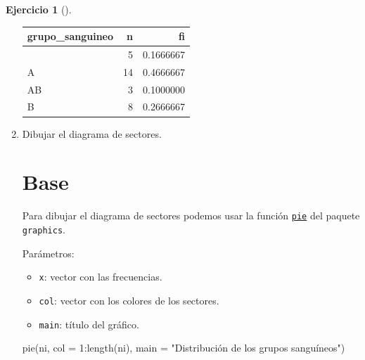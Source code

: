\documentclass[
  spanish,
  a4paper,
]{scrreport}
\newenvironment{Shaded}{\begin{snugshade}}{\end{snugshade}}
\newcommand{\AttributeTok}[1]{\textcolor[rgb]{0.40,0.45,0.13}{#1}}
\newcommand{\DecValTok}[1]{\textcolor[rgb]{0.68,0.00,0.00}{#1}}
\newcommand{\FunctionTok}[1]{\textcolor[rgb]{0.28,0.35,0.67}{#1}}
\newcommand{\NormalTok}[1]{\textcolor[rgb]{0.00,0.23,0.31}{#1}}
\newcommand{\SpecialCharTok}[1]{\textcolor[rgb]{0.37,0.37,0.37}{#1}}
\newcommand{\StringTok}[1]{\textcolor[rgb]{0.13,0.47,0.30}{#1}}
\providecommand{\tightlist}{%
  \setlength{\itemsep}{0pt}\setlength{\parskip}{0pt}}
\theoremstyle{definition}
\newtheorem{exercise}{Ejercicio}[chapter]
\theoremstyle{remark}
\begin{document}
\begin{exercise}[]
\begin{enumerate}
\begin{tcolorbox}
  \begin{longtable}[]{@{}lrr@{}}
  \toprule\noalign{}
  grupo\_sanguineo & n & fi \\
  \midrule\noalign{}
  \endhead
  \bottomrule\noalign{}
  \endlastfoot
  0 & 5 & 0.1666667 \\
  A & 14 & 0.4666667 \\
  AB & 3 & 0.1000000 \\
  B & 8 & 0.2666667 \\
  \end{longtable}

  \end{tcolorbox}
\item
  Dibujar el diagrama de sectores.

  \begin{tcolorbox}[enhanced jigsaw, colback=white, coltitle=black, toprule=.15mm, rightrule=.15mm, opacitybacktitle=0.6, opacityback=0, bottomtitle=1mm, toptitle=1mm, titlerule=0mm, breakable, leftrule=.75mm, title=\textcolor{quarto-callout-tip-color}{\faLightbulb}\hspace{0.5em}{Solución}, arc=.35mm, left=2mm, bottomrule=.15mm, colframe=quarto-callout-tip-color-frame, colbacktitle=quarto-callout-tip-color!10!white]

  \section{Base}

  Para dibujar el diagrama de sectores podemos usar la función
  \href{https://www.rdocumentation.org/packages/graphics/versions/3.6.2/topics/pie}{\texttt{pie}}
  del paquete \texttt{graphics}.

  Parámetros:

  \begin{itemize}
  \tightlist
  \item
    \texttt{x}: vector con las frecuencias.
  \item
    \texttt{col}: vector con los colores de los sectores.
  \item
    \texttt{main}: título del gráfico.
  \end{itemize}

\begin{Shaded}
\begin{Highlighting}[]
\FunctionTok{pie}\NormalTok{(ni, }\AttributeTok{col =} \DecValTok{1}\SpecialCharTok{:}\FunctionTok{length}\NormalTok{(ni), }\AttributeTok{main =} \StringTok{"Distribución de los grupos sanguíneos"}\NormalTok{)}
\end{Highlighting}
\end{Shaded}


\end{tcolorbox}
\end{enumerate}
\end{exercise}
\end{document}
